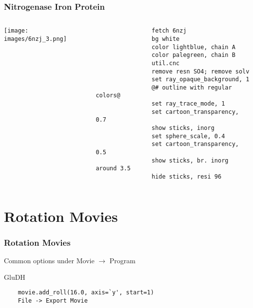 \documentclass[aspectratio=169]{beamer}
\begin{document}
\begin{frame}[fragile]
\frametitle{Nitrogenase Iron Protein}
    \begin{columns}
        \begin{column}{0.50\textwidth}
            \texttt{[image: images/6nzj\_3.png]}
        \end{column}
        \begin{column}{0.50\textwidth}
            \begin{lstlisting}
                fetch 6nzj
                bg white 
                color lightblue, chain A
                color palegreen, chain B
                util.cnc
                remove resn SO4; remove solv
                set ray_opaque_background, 1
                @# outline with regular colors@
                set ray_trace_mode, 1  
                set cartoon_transparency, 0.7
                show sticks, inorg
                set sphere_scale, 0.4
                set cartoon_transparency, 0.5
                show sticks, br. inorg around 3.5
                hide sticks, resi 96
            \end{lstlisting}
        \end{column}
    \end{columns}
\end{frame}

\section{Rotation Movies}
\begin{frame}[fragile]
    \frametitle{Rotation Movies}

    Common options under Movie $\rightarrow$ Program 

    \vspace*{1.5cm}
    GluDH

    \begin{lstlisting}
    movie.add_roll(16.0, axis=`y', start=1)
    File -> Export Movie
    \end{lstlisting}

    \href{https://youtu.be/eaRJjZ0OLRs}{\color{blue}{https://youtu.be/eaRJjZ0OLRs}}
\end{frame}
\end{document}
